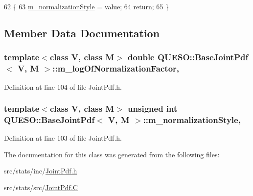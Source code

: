 \begin{DoxyCode}
62 \{
63   \hyperlink{class_q_u_e_s_o_1_1_base_joint_pdf_a138c99bcef7a67077d9612bddfdcb896}{m\_normalizationStyle} = value;
64   \textcolor{keywordflow}{return};
65 \}
\end{DoxyCode}


\subsection{Member Data Documentation}
\hypertarget{class_q_u_e_s_o_1_1_base_joint_pdf_ae82d4191f17af8c7a26226d127bc7850}{
\subsubsection[{m\-\_\-log\-Of\-Normalization\-Factor}]{\setlength{\rightskip}{0pt plus 5cm}template$<$class V, class M$>$ double {\bf Q\-U\-E\-S\-O\-::\-Base\-Joint\-Pdf}$<$ V, M $>$\-::m\-\_\-log\-Of\-Normalization\-Factor\hspace{0.3cm}{\ttfamily [mutable]}, {\ttfamily [protected]}}}\label{class_q_u_e_s_o_1_1_base_joint_pdf_ae82d4191f17af8c7a26226d127bc7850}


Definition at line 104 of file Joint\-Pdf.\-h.

\hypertarget{class_q_u_e_s_o_1_1_base_joint_pdf_a138c99bcef7a67077d9612bddfdcb896}{
\subsubsection[{m\-\_\-normalization\-Style}]{\setlength{\rightskip}{0pt plus 5cm}template$<$class V, class M$>$ unsigned int {\bf Q\-U\-E\-S\-O\-::\-Base\-Joint\-Pdf}$<$ V, M $>$\-::m\-\_\-normalization\-Style\hspace{0.3cm}{\ttfamily [mutable]}, {\ttfamily [protected]}}}\label{class_q_u_e_s_o_1_1_base_joint_pdf_a138c99bcef7a67077d9612bddfdcb896}


Definition at line 103 of file Joint\-Pdf.\-h.



The documentation for this class was generated from the following files\-:\begin{DoxyCompactItemize}
\item 
src/stats/inc/\hyperlink{_joint_pdf_8h}{Joint\-Pdf.\-h}\item 
src/stats/src/\hyperlink{_joint_pdf_8_c}{Joint\-Pdf.\-C}\end{DoxyCompactItemize}
